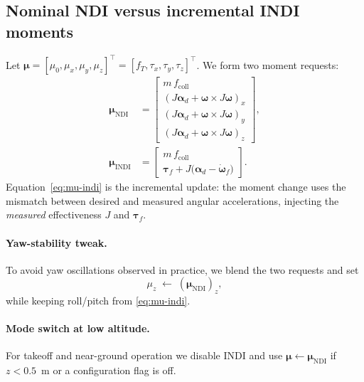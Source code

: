 \subsection{Nominal NDI versus incremental INDI moments}\label{sec:ndi-vs-indi}
Let $\boldsymbol{\mu}=[\mu_0,\mu_x,\mu_y,\mu_z]^\top=[f_T,\tau_x,\tau_y,\tau_z]^\top$.
We form two moment requests:
\begin{align}
\boldsymbol{\mu}_{\text{NDI}} &=
\begin{bmatrix}
m\,f_{\text{coll}}\\
(J\boldsymbol{\alpha}_d + \boldsymbol{\omega}\times J\boldsymbol{\omega})_x\\
(J\boldsymbol{\alpha}_d + \boldsymbol{\omega}\times J\boldsymbol{\omega})_y\\
(J\boldsymbol{\alpha}_d + \boldsymbol{\omega}\times J\boldsymbol{\omega})_z
\end{bmatrix},
\label{eq:mu-ndi}\\
\boldsymbol{\mu}_{\text{INDI}} &=
\begin{bmatrix}
m\,f_{\text{coll}}\\
\boldsymbol{\tau}_f + J\big(\boldsymbol{\alpha}_d - \dot{\boldsymbol{\omega}}_f\big)
\end{bmatrix}.
\label{eq:mu-indi}
\end{align}
Equation~\eqref{eq:mu-indi} is the incremental update: the moment change uses the mismatch
between desired and measured angular accelerations, injecting the \emph{measured} effectiveness
$J$ and $\boldsymbol{\tau}_f$.

\paragraph{Yaw-stability tweak.}
To avoid yaw oscillations observed in practice, we blend the two requests and set
\begin{equation}
\mu_z \;\leftarrow\; (\boldsymbol{\mu}_{\text{NDI}})_z,
\end{equation}
while keeping roll/pitch from \eqref{eq:mu-indi}.

\paragraph{Mode switch at low altitude.}
For takeoff and near-ground operation we disable INDI and use
$\boldsymbol{\mu}\leftarrow\boldsymbol{\mu}_{\text{NDI}}$ if $z<0.5$~m or a configuration flag is off.

